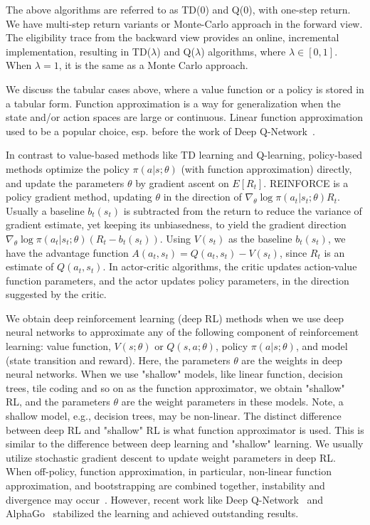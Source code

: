 The above algorithms are referred to as TD(0) and Q(0), with one-step return. We have multi-step return variants or Monte-Carlo approach in the forward view. The eligibility trace from the backward view provides an online, incremental implementation, resulting in TD($\lambda$) and Q($\lambda$) algorithms, where $\lambda \in[0,1]$. When $\lambda = 1$, it is the same as a Monte Carlo approach. 

We discuss the tabular cases above, where a value function or a policy is stored in a tabular form. Function approximation is a way for generalization when the state and/or action spaces are large or continuous. Linear function approximation used to be a popular choice, esp. before the work of Deep Q-Network~\citep{Atari}.


In contrast to value-based methods like TD learning and Q-learning, policy-based methods optimize the policy $\pi(a|s; \theta)$ (with function approximation) directly, and update the parameters $\theta$ by gradient ascent on $E[R_t]$. REINFORCE is a policy gradient method, updating $\theta$ in the direction of $\nabla_{\theta} \log \pi(a_t|s_t; \theta) R_t$. Usually a baseline $b_t(s_t)$ is subtracted from the return to reduce the variance of gradient estimate, yet keeping its unbiasedness, to yield the gradient direction $\nabla_{\theta} \log \pi(a_t|s_t; \theta) (R_t - b_t(s_t))$. Using $V(s_t)$ as the baseline $b_t(s_t)$, we have the advantage function $A(a_t, s_t) = Q(a_t, s_t) - V(s_t)$, since $R_t$ is an estimate of $Q(a_t, s_t)$. In actor-critic algorithms, the critic updates action-value function parameters, and the actor updates policy parameters, in the direction suggested by the critic.

We obtain deep reinforcement learning (deep RL) methods when we use deep neural networks to approximate any of the following component of reinforcement learning: value function, $V(s; \theta)$ or $Q(s,a; \theta)$, policy $\pi(a|s; \theta)$, and model (state transition and reward). Here, the parameters $\theta$ are the weights in deep neural networks. When we use "shallow" models, like linear function, decision trees, tile coding and so on as the function approximator, we obtain "shallow" RL, and the parameters $\theta$ are the weight parameters in these models. Note, a shallow model, e.g., decision trees, may be non-linear. The distinct difference between deep RL and "shallow" RL is what function approximator is used. This is similar to the difference between deep learning and "shallow" learning. We usually utilize stochastic gradient descent to update weight parameters in deep RL. When off-policy, function approximation, in particular, non-linear function approximation, and bootstrapping are combined together, instability and divergence may occur~\citep{TDWithApproximator}. However, recent work like Deep Q-Network~\citep{Atari} and AlphaGo~\citep{AlphaGo} stabilized the learning and achieved outstanding results.

